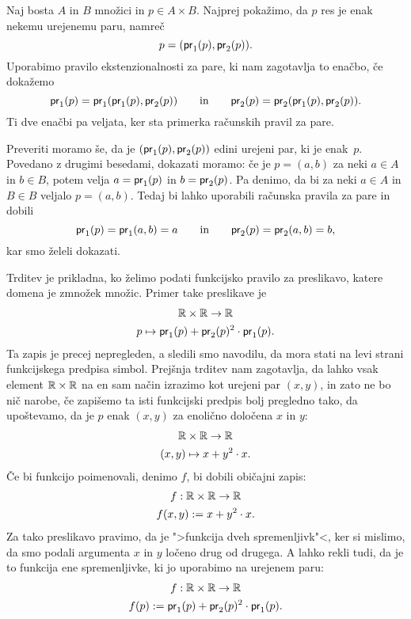 \begin{dokaz}
  Naj bosta $A$ in $B$ množici in $p \in A \times B$. Najprej pokažimo, da $p$ res je enak
  nekemu urejenemu paru, namreč
  \begin{equation*}
    p = (\mathsf{pr}_1(p), \mathsf{pr}_2(p)).
  \end{equation*}
  Uporabimo pravilo ekstenzionalnosti za pare, ki nam zagotavlja to enačbo, če dokažemo
  \begin{equation*}
    \mathsf{pr}_1(p) = \mathsf{pr}_1(\mathsf{pr}_1(p), \mathsf{pr}_2(p))
    \qquad\text{in}\qquad
    \mathsf{pr}_2(p) = \mathsf{pr}_2(\mathsf{pr}_1(p), \mathsf{pr}_2(p)).
  \end{equation*}
  Ti dve enačbi pa veljata, ker sta primerka računskih pravil za pare.

  Preveriti moramo še, da je $(\mathsf{pr}_1(p), \mathsf{pr}_2(p))$ edini urejeni par, ki je enak~$p$.
  Povedano z drugimi besedami, dokazati moramo: če je $p = (a, b)$ za neki $a \in A$ in
  $b \in B$, potem velja $a = \mathsf{pr}_1(p)$ in $b = \mathsf{pr}_2(p)$. Pa denimo, da bi za neki
  $a \in A$ in $B \in B$ veljalo $p = (a,b)$. Tedaj bi lahko uporabili računska pravila za
  pare in dobili
  \begin{equation*}
    \mathsf{pr}_1(p) = \mathsf{pr}_1(a, b) = a
    \qquad\text{in}\qquad
    \mathsf{pr}_2(p) = \mathsf{pr}_2(a, b) = b,
  \end{equation*}
  kar smo želeli dokazati.
\end{dokaz}

Trditev je prikladna, ko želimo podati funkcijsko pravilo za preslikavo, katere domena je
zmnožek množic. Primer take preslikave je
%
\begin{gather*}
  \mathbb{R} \times \mathbb{R} \to \mathbb{R} \\
  p \mapsto \mathsf{pr}_1(p) + \mathsf{pr}_2(p)^2 \cdot \mathsf{pr}_1(p).
\end{gather*}
%
Ta zapis je precej nepregleden, a sledili smo navodilu, da mora stati na levi strani
funkcijskega predpisa simbol. Prejšnja trditev nam zagotavlja, da lahko vsak element
$\mathbb{R} \times \mathbb{R}$ na en sam način izrazimo kot urejeni par $(x, y)$, in zato ne bo nič
narobe, če zapišemo ta isti funkcijski predpis bolj pregledno tako, da upoštevamo, da
je $p$ enak $(x, y)$ za enolično določena $x$ in $y$:
%
\begin{gather*}
  \mathbb{R} \times \mathbb{R} \to \mathbb{R} \\
  (x, y) \mapsto x + y^2 \cdot x.
\end{gather*}
%
Če bi funkcijo poimenovali, denimo $f$, bi dobili običajni zapis:
%
\begin{gather*}
  f : \mathbb{R} \times \mathbb{R} \to \mathbb{R} \\
  f(x, y) \mathrel{{:}{=}} x + y^2 \cdot x.
\end{gather*}
%
Za tako preslikavo pravimo, da je ">funkcija dveh spremenljivk"<, ker si mislimo, da smo
podali argumenta $x$ in $y$ ločeno drug od drugega. A lahko rekli tudi, da je to funkcija
ene spremenljivke, ki jo uporabimo na urejenem paru:
%
\begin{gather*}
  f : \mathbb{R} \times \mathbb{R} \to \mathbb{R} \\
  f(p) \mathrel{{:}{=}} \mathsf{pr}_1(p) + \mathsf{pr}_2(p)^2 \cdot \mathsf{pr}_1(p).
\end{gather*}



